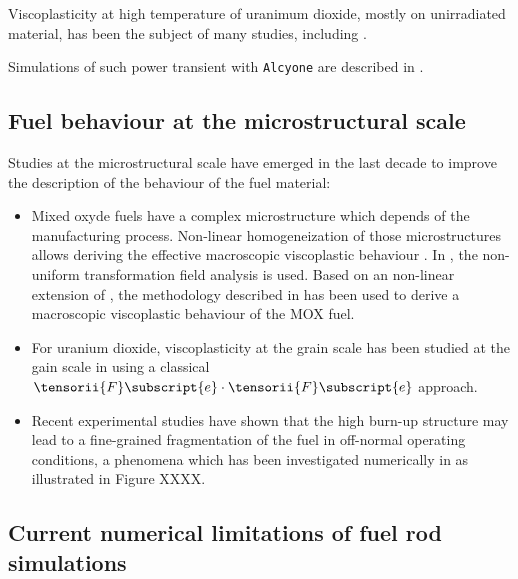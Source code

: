 Viscoplasticity at high temperature of uranimum dioxide, mostly
on unirradiated material, has been the subject of many studies,
including
\cite{colin_etude_2003, monerie_overall_2006, salvo_experimental_2015, salvo_experimental_2015-1, garcia_effect_2020}.

Simulations of such power transient with \texttt{Alcyone} are described in
\cite{helfer_etude_2006,michel_3d_2008}.

\subsection{Fuel behaviour at the microstructural scale}


Studies at the microstructural scale have emerged in the last decade to
improve the description of the behaviour of the fuel material:

\begin{itemize}
    \item Mixed oxyde fuels have a complex microstructure which depends of the
    manufacturing process. Non-linear homogeneization of those
    microstructures allows deriving the effective macroscopic viscoplastic
    behaviour \cite{el_abdi_generation_2018}. In
    \cite{roussette_analyse_2005, largenton_modelisation_2012, largenton_extension_2019},
    the non-uniform transformation field analysis is used. Based on an
    non-linear extension of \cite{ricaud_effective_2009}, the methodology
    described in \cite{masson_modified_2020} has been used to derive a
    macroscopic viscoplastic behaviour of the MOX fuel.
    \item For uranium dioxide, viscoplasticity at the grain scale has been
    studied at the gain scale in \cite{portelette_crystal_2018} using a
    classical $\tensorii{F}\subscript{e} \cdot \tensorii{F}\subscript{e}$ approach.
    \item Recent experimental studies have shown that the high burn-up structure
    may lead to a fine-grained fragmentation of the fuel in off-normal
    operating conditions, a phenomena which has been investigated
    numerically in \cite{esnoul_etude_2018} as illustrated in Figure
    XXXX.
\end{itemize}

\subsection{Current numerical limitations of fuel rod simulations}

